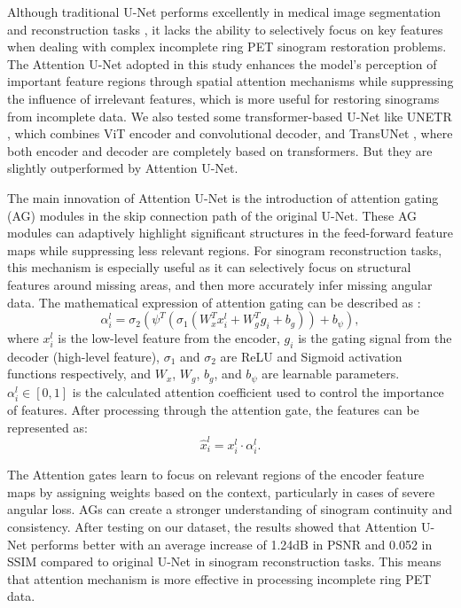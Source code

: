 \documentclass[aps,prb,preprint,groupedaddress,showkeys]{revtex4}
\begin{document}
Although traditional U-Net performs excellently in medical image segmentation and reconstruction tasks \cite{ronneberger2015unetconvolutionalnetworksbiomedical}, it lacks the ability to selectively focus on key features when dealing with complex incomplete ring PET sinogram restoration problems. The Attention U-Net \cite{oktay2018attentionunetlearninglook} adopted in this study enhances the model's perception of important feature regions through spatial attention mechanisms while suppressing the influence of irrelevant features, which is more useful for restoring sinograms from incomplete data. We also tested some transformer-based U-Net like UNETR \cite{hatamizadeh2021unetrtransformers3dmedical}, which combines ViT encoder and convolutional decoder, and TransUNet \cite{chen2021transunettransformersmakestrong}, where both encoder and decoder are completely based on transformers. But they are slightly outperformed by Attention U-Net.

The main innovation of Attention U-Net is the introduction of attention gating (AG) modules in the skip connection path of the original U-Net. These AG modules can adaptively highlight significant structures in the feed-forward feature maps while suppressing less relevant regions. 
For sinogram reconstruction tasks, this mechanism is especially useful as it can selectively focus on structural features around missing areas, and then more accurately infer missing angular data. The mathematical expression of attention gating can be described as \cite{oktay2018attentionunetlearninglook}:
\begin{equation}
\alpha_i^l = \sigma_2(\psi^T(\sigma_1(W_x^T x_i^l + W_g^T g_i + b_g)) + b_\psi),
\end{equation}
where $x_i^l$ is the low-level feature from the encoder, $g_i$ is the gating signal from the decoder (high-level feature), $\sigma_1$ and $\sigma_2$ are ReLU and Sigmoid activation functions respectively, and $W_x$, $W_g$, $b_g$, and $b_\psi$ are learnable parameters. $\alpha_i^l \in [0,1]$ is the calculated attention coefficient used to control the importance of features.
After processing through the attention gate, the features can be represented as:
\begin{equation}
\hat{x}_i^l = x_i^l \cdot \alpha_i^l.
\end{equation}

The Attention gates learn to focus on relevant regions of the encoder feature maps by assigning weights based on the context, particularly in cases of severe angular loss. AGs can create a stronger understanding of sinogram continuity and consistency.
After testing on our dataset, the results showed that Attention U-Net performs better with an average increase of 1.24dB in PSNR and 0.052 in SSIM compared to original U-Net in sinogram reconstruction tasks. This means that attention mechanism is more effective in processing incomplete ring PET data.
\end{document}
